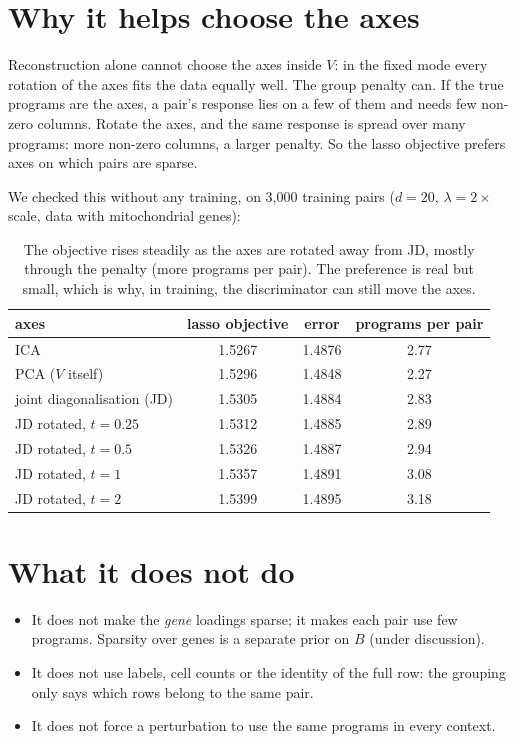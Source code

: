 \documentclass[11pt]{article}
\begin{document}
\section{Why it helps choose the axes}

Reconstruction alone cannot choose the axes inside $V$: in the fixed mode every
rotation of the axes fits the data equally well. The group penalty can. If
the true programs are the axes, a pair's response lies on a few of them and
needs few non-zero columns. Rotate the axes, and the same response is spread
over many programs: more non-zero columns, a larger penalty. So the lasso
objective prefers axes on which pairs are sparse.

We checked this without any training, on 3{,}000 training pairs
($d=20$, $\lambda = 2\times$ scale, data with mitochondrial genes):

\begin{table}[h]
\centering\small
\begin{tabular}{lccc}
\toprule
axes & lasso objective & error & programs per pair \\
\midrule
ICA                         & 1.5267 & 1.4876 & 2.77 \\
PCA ($V$ itself)            & 1.5296 & 1.4848 & 2.27 \\
joint diagonalisation (JD)  & 1.5305 & 1.4884 & 2.83 \\
JD rotated, $t=0.25$        & 1.5312 & 1.4885 & 2.89 \\
JD rotated, $t=0.5$         & 1.5326 & 1.4887 & 2.94 \\
JD rotated, $t=1$           & 1.5357 & 1.4891 & 3.08 \\
JD rotated, $t=2$           & 1.5399 & 1.4895 & 3.18 \\
\bottomrule
\end{tabular}
\caption{The objective rises steadily as the axes are rotated away from JD,
mostly through the penalty (more programs per pair). The preference is real
but small, which is why, in training, the discriminator can still move the
axes.}
\end{table}

\section{What it does not do}

\begin{itemize}
  \item It does not make the \emph{gene} loadings sparse; it makes each pair
  use few programs. Sparsity over genes is a separate prior on $B$ (under
  discussion).
  \item It does not use labels, cell counts or the identity of the full row:
  the grouping only says which rows belong to the same pair.
  \item It does not force a perturbation to use the same programs in every
  context.
\end{itemize}
\end{document}
